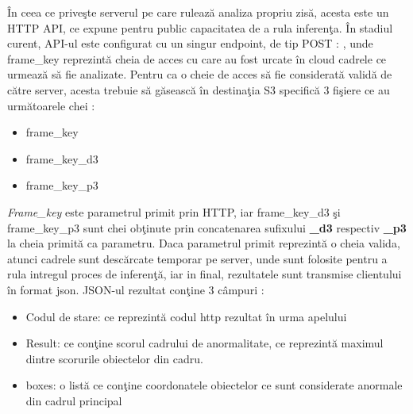 \documentclass[a4paper,12pt]{report}
\begin{document}
\par
În ceea ce priveşte serverul pe care rulează analiza propriu zisă, acesta este un HTTP API, ce expune pentru public capacitatea de a rula inferenţa. În stadiul curent, API-ul este configurat cu un singur endpoint, de tip POST  :  , unde frame\_key reprezintă cheia de acces cu care au fost urcate în cloud cadrele ce urmează să fie analizate. Pentru ca o cheie de acces să fie considerată validă de către server, acesta trebuie să găsească în destinaţia S3 specifică 3 fişiere ce au următoarele chei :
\begin{itemize}
\item frame\_key
\item frame\_key\_d3
\item frame\_key\_p3
\end{itemize}
\par \emph{Frame\_key} este parametrul primit prin HTTP,  iar frame\_key\_d3 şi frame\_key\_p3 sunt chei obţinute prin concatenarea sufixului \textbf{\_d3} respectiv \textbf{\_p3} la cheia primită ca parametru. Daca parametrul primit reprezintă o cheia valida, atunci cadrele sunt descărcate temporar pe server, unde sunt folosite pentru a rula intregul proces de inferenţă, iar in final, rezultatele sunt transmise clientului în format json. 
JSON-ul rezultat conţine 3 câmpuri : 
\begin{itemize}
\item Codul de stare: ce reprezintă codul http rezultat în urma apelului
\item Result: ce conţine scorul cadrului de anormalitate, ce reprezintă maximul dintre scorurile obiectelor din cadru.
\item boxes: o listă ce conţine coordonatele obiectelor ce sunt considerate anormale din cadrul principal
\end{itemize}
\end{document}
